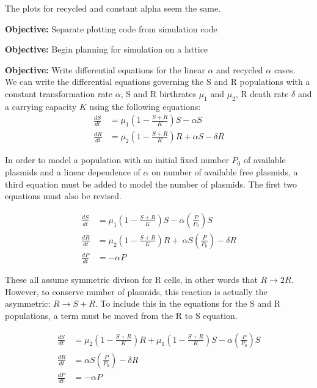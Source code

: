 \documentclass[oneside]{labbook}
\newcommand{\obj}[1]{\textbf{Objective:} #1\\}
\begin{document}
The plots for recycled and constant alpha seem the same.




\obj{Separate plotting code from simulation code}





\obj{Begin planning for simulation on a lattice}



\obj{Write differential equations for the linear $\alpha$ and recycled $\alpha$
cases.}

We can write the differential equations governing the S and R populations with a
constant transformation rate $\alpha$, S and R birthrates $\mu_1$ and $\mu_2$,
R death rate $\delta$ and a carrying capacity $K$ using the following equations:
\begin{align}
\frac{dS}{dt}& = \mu_1 \left(1 - \frac{S + R}{K}\right)S - \alpha S \\
\frac{dR}{dt}& = \mu_2 \left(1 - \frac{S + R}{K}\right)R + \alpha S - \delta R
\end{align}

In order to model a population with an initial fixed number $P_0$ of available
plasmids and a linear dependence of $\alpha$ on number of available free plasmids,
a third equation must be added to model the number of plasmids. The first two
equations must also be revised.

\begin{align}
  \frac{dS}{dt} & = \mu_1 \left(1 - \frac{S + R}{K}\right)S - \alpha
  \left( \frac{P}{P_0} \right) S \\
\frac{dR}{dt} & = \mu_2 \left(1 - \frac{S + R}{K}\right)R + \
  \alpha S  \left( \frac{P}{P_0} \right) - \delta R \\
\frac{dP}{dt} & = -\alpha P
\end{align}

These all assume symmetric divison for R cells, in other words that
$R \rightarrow 2R$. However, to conserve number of plasmids, this reaction is
actually the asymmetric: $R \rightarrow S + R$. To include this in the equations
for the S and R populations, a term must be moved from the R to S equation.

\begin{align}
  \frac{dS}{dt} & = \mu_2 \left(1 - \frac{S + R}{K}\right)R +
  \mu_1 \left(1 - \frac{S + R}{K}\right)S - \alpha
  \left( \frac{P}{P_0} \right) S \\
\frac{dR}{dt} & =  \alpha S  \left( \frac{P}{P_0} \right) - \delta R \\
\frac{dP}{dt} & = -\alpha P
\end{align}
\end{document}

